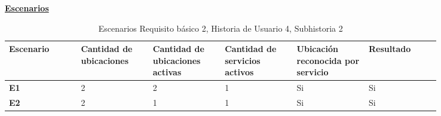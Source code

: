 \documentclass[../ei103948-project-documentation.tex]{subfiles}
\begin{document}
					\begin{center}
						\textbf{\underline{Escenarios}}
						\begin{table}[H]
							\centering
							\begin{tabular}{|p{0.14\linewidth}|p{0.14\linewidth}|p{0.14\linewidth}|p{0.14\linewidth}|p{0.14\linewidth}|p{0.14\linewidth}|}
								\hline
								\textbf{Escenario} & \textbf{Cantidad de ubicaciones} & \textbf{Cantidad de ubicaciones activas} & \textbf{Cantidad de servicios activos} & \textbf{Ubicación reconocida por servicio} & \textbf{Resultado} \\ \hline
								\textbf{E1}        & 2                                & 2                                        & 1                                      & Si                                         & Si                 \\ \hline
								\textbf{E2}        & 2                                & 1                                        & 1                                      & Si                                         & Si                 \\ \hline
								\end{tabular}
							\caption{Escenarios Requisito básico 2, Historia de Usuario 4, Subhistoria 2}
						\end{table}

						\newpage

						\descripcionBasicaQ


\end{center}
\end{document}
